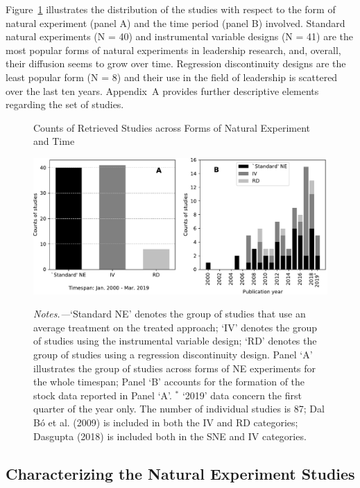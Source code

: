 \documentclass[english]{article}
\begin{document}
Figure~\ref{fig:ne_studies_distr} illustrates the distribution of the
studies with respect to the form of natural experiment (panel A) and the time
period (panel B) involved. Standard natural experiments (N = 40) and
instrumental variable designs (N = 41) are the most popular forms of natural
experiments in leadership research, and, overall, their diffusion seems to grow
over time. Regression discontinuity designs are the least popular form (N = 8)
and their use in the field of leadership is scattered over the last ten years.
Appendix~A provides further descriptive elements regarding the set of studies.

\begin{figure}[!htbp]

	\centering
	\caption{Counts of Retrieved Studies across Forms of Natural
	Experiment and Time}
	\includegraphics[width=1\textwidth]{_0}
	\label{fig:ne_studies_distr}
	\caption*{\textit{Notes.---}`Standard NE'
	denotes the group of studies that use an average treatment on the
	treated approach; `IV' denotes the group of studies using the
	instrumental variable design; `RD' denotes the group of studies using a
	regression discontinuity design. Panel `A' illustrates the group of
	studies across forms of NE experiments for the whole timespan; Panel `B'
	accounts for the formation of the stock data reported in Panel `A'.
	$^{*}$ `2019' data concern the first quarter of the year only. The
	number of individual studies is 87; Dal Bó et al. (2009) is included in
	both the IV and RD categories; Dasgupta (2018) is included both in the
	SNE and IV categories.}

\end{figure}

\subsection{Characterizing the Natural Experiment Studies}
\end{document}
